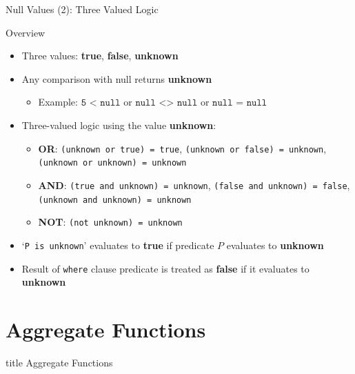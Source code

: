 \documentclass[aspectratio=169, xcolor=dvipsnames]{beamer}
\begin{document}
\begin{frame}{Null Values (2): Three Valued Logic}
    \begin{block}{Overview}
        \begin{itemize}[<+->]
            \item Three values: \textbf{true}, \textbf{false}, \textbf{unknown}
            \item Any comparison with null returns \textbf{unknown}
            \begin{itemize}
                \item[$\triangleright$] Example: $\texttt{5 < null}$ \quad or \quad $\texttt{null <> null}$ \quad or \quad $\texttt{null = null}$
            \end{itemize}
            \item Three-valued logic using the value \textbf{unknown}:
            \begin{itemize}
                \item[$\triangleright$] \textbf{OR}: \texttt{(unknown or true) = true}, \texttt{(unknown or false) = unknown}, \texttt{(unknown or unknown) = unknown}
                \item[$\triangleright$] \textbf{AND}: \texttt{(true and unknown) = unknown}, \texttt{(false and unknown) = false}, \texttt{(unknown and unknown) = unknown}
                \item[$\triangleright$] \textbf{NOT}: \texttt{(not unknown) = unknown}
            \end{itemize}
            \item `\texttt{P is unknown}' evaluates to \textbf{true} if predicate $P$ evaluates to \textbf{unknown}
            \item Result of \texttt{where} clause predicate is treated as \textbf{false} if it evaluates to \textbf{unknown}
        \end{itemize}
    \end{block}
\end{frame}

\section{Aggregate Functions}

\begin{frame}
  \vfill
  \centering
  \begin{beamercolorbox}[sep=8pt,center,shadow=true,rounded=true]{title}
    Aggregate Functions\par%
  \end{beamercolorbox}
  \vfill
\end{frame}
\end{document}

